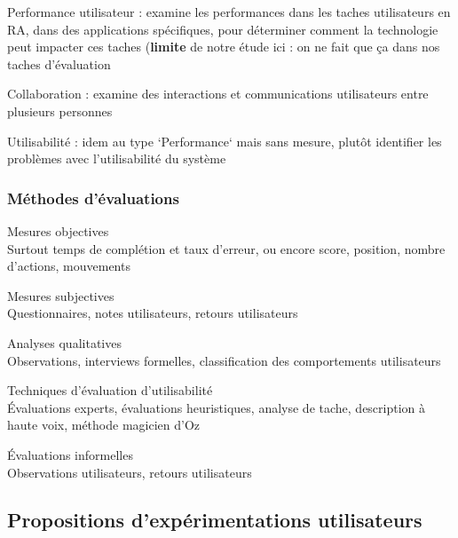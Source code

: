 Performance utilisateur : examine les performances dans les taches utilisateurs en RA, dans des applications spécifiques, pour déterminer comment la technologie peut impacter ces taches (\textbf{limite} de notre étude ici : on ne fait que ça dans nos taches d'évaluation

Collaboration : examine des interactions et communications utilisateurs entre plusieurs personnes

Utilisabilité : idem au type `Performance` mais sans mesure, plutôt identifier les problèmes avec l'utilisabilité du système

\subsubsection{Méthodes d'évaluations}
Mesures objectives\\
  Surtout temps de complétion et taux d'erreur, ou encore score, position, nombre d'actions, mouvements \cite{DuenserGrassetBillinghurst2008}

Mesures subjectives\\
  Questionnaires, notes utilisateurs, retours utilisateurs \cite{DuenserGrassetBillinghurst2008}

Analyses qualitatives\\
  Observations, interviews formelles, classification des comportements utilisateurs \cite{DuenserGrassetBillinghurst2008}

Techniques d'évaluation d'utilisabilité\\
  Évaluations experts, évaluations heuristiques, analyse de tache, description à haute voix, méthode magicien d'Oz \cite{DuenserGrassetBillinghurst2008}

Évaluations informelles\\
  Observations utilisateurs, retours utilisateurs \cite{DuenserGrassetBillinghurst2008}


\subsection{Propositions d'expérimentations utilisateurs}

